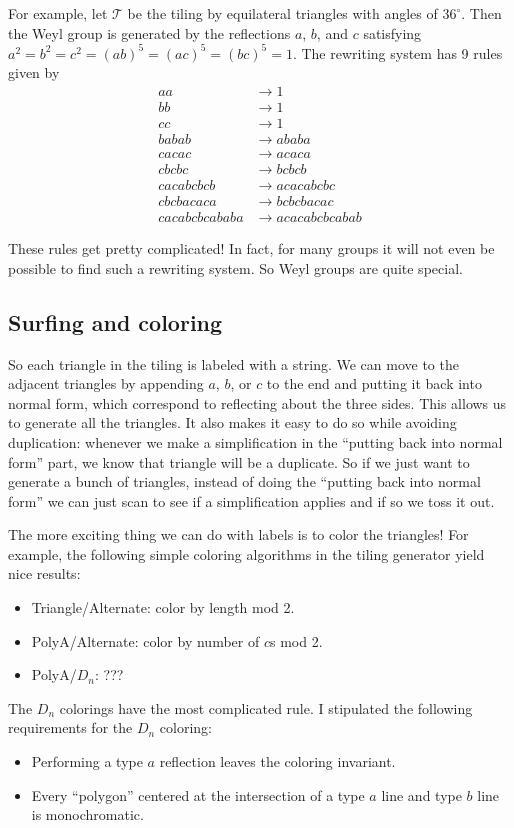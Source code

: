 \documentclass{article}
\theoremstyle{definition}
\theoremstyle{remark}
\begin{document}
For example, let $\mathcal T$ be the tiling by equilateral triangles with angles of $36^\circ$. Then the Weyl group is generated by the reflections $a$, $b$, and $c$ satisfying $a^2=b^2=c^2=(ab)^5=(ac)^5=(bc)^5=1$. The rewriting system has 9 rules given by
\begin{align*}
    aa&\to 1\\
    bb&\to 1\\
    cc&\to 1\\
    babab&\to ababa\\
    cacac&\to acaca\\
    cbcbc&\to bcbcb\\
    cacabcbcb&\to acacabcbc\\
    cbcbacaca&\to bcbcbacac\\
    cacabcbcababa&\to acacabcbcabab
\end{align*}

These rules get pretty complicated! In fact, for many groups it will not even be possible to find such a rewriting system. So Weyl groups are quite special.

\subsection{Surfing and coloring}
So each triangle in the tiling is labeled with a string. We can move to the adjacent triangles by appending $a$, $b$, or $c$ to the end and putting it back into normal form, which correspond to reflecting about the three sides. This allows us to generate all the triangles. It also makes it easy to do so while avoiding duplication: whenever we make a simplification in the ``putting back into normal form'' part, we know that triangle will be a duplicate. So if we just want to generate a bunch of triangles, instead of doing the ``putting back into normal form'' we can just scan to see if a simplification applies and if so we toss it out.

The more exciting thing we can do with labels is to color the triangles! For example, the following simple coloring algorithms in the tiling generator yield nice results:
\begin{itemize}
    \item Triangle/Alternate: color by length mod 2.
    \item PolyA/Alternate: color by number of $c$s mod 2.
    \item PolyA/$D_n$: ???
\end{itemize}

The $D_n$ colorings have the most complicated rule. I stipulated the following requirements for the $D_n$ coloring:
\begin{itemize}
    \item Performing a type $a$ reflection leaves the coloring invariant.
    \item Every ``polygon'' centered at the intersection of a type $a$ line and type $b$ line is monochromatic.
\end{itemize}
\end{document}
